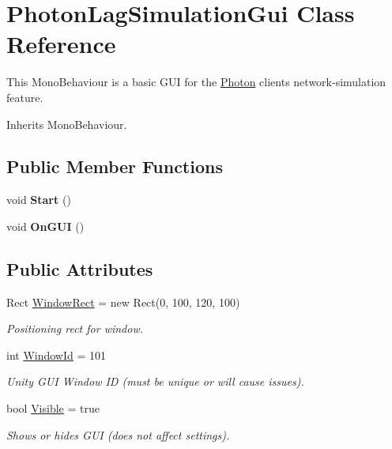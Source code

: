 \hypertarget{class_photon_lag_simulation_gui}{}\section{Photon\+Lag\+Simulation\+Gui Class Reference}
\label{class_photon_lag_simulation_gui}


This Mono\+Behaviour is a basic G\+UI for the \hyperlink{namespace_photon}{Photon} client\textquotesingle{}s network-\/simulation feature.  




Inherits Mono\+Behaviour.

\subsection*{Public Member Functions}
\begin{DoxyCompactItemize}
\item 
void {\bfseries Start} ()\hypertarget{class_photon_lag_simulation_gui_ab080d78f9ae59eeb2779b5e61be897bb}{}\label{class_photon_lag_simulation_gui_ab080d78f9ae59eeb2779b5e61be897bb}

\item 
void {\bfseries On\+G\+UI} ()\hypertarget{class_photon_lag_simulation_gui_abc9399cb95160e6994a1ad8661adbdc5}{}\label{class_photon_lag_simulation_gui_abc9399cb95160e6994a1ad8661adbdc5}

\end{DoxyCompactItemize}
\subsection*{Public Attributes}
\begin{DoxyCompactItemize}
\item 
Rect \hyperlink{class_photon_lag_simulation_gui_a1d267bda81b30f6b32f77e4b5cc90649}{Window\+Rect} = new Rect(0, 100, 120, 100)
\begin{DoxyCompactList}\small\item\em Positioning rect for window.\end{DoxyCompactList}\item 
int \hyperlink{class_photon_lag_simulation_gui_a0e20da80809bd2181828edabed39ccc9}{Window\+Id} = 101
\begin{DoxyCompactList}\small\item\em Unity G\+UI Window ID (must be unique or will cause issues).\end{DoxyCompactList}\item 
bool \hyperlink{class_photon_lag_simulation_gui_ad790a872afa4c4c1b34401f55982203a}{Visible} = true
\begin{DoxyCompactList}\small\item\em Shows or hides G\+UI (does not affect settings).\end{DoxyCompactList}\end{DoxyCompactItemize}
